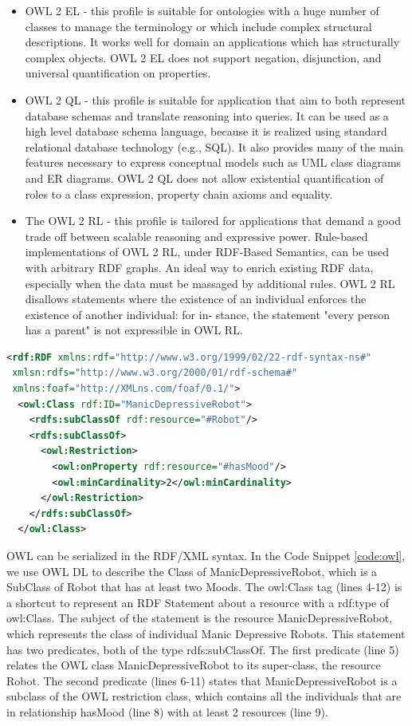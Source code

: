 \begin{itemize}
\item OWL 2 EL - this profile is suitable for ontologies with a huge number of classes to manage the terminology or which include complex structural descriptions. It works well for domain an applications which has structurally complex objects. OWL 2 EL does not support negation, disjunction, and universal quantification on properties.

\item OWL 2 QL  - this profile is suitable for application that aim to both represent database schemas  and translate reasoning into queries. It can be used as a high level database schema language, because it is realized using standard relational database technology (e.g., SQL). It also provides many of the main features necessary to express conceptual models such as UML class diagrams and ER diagrams. OWL 2 QL does not allow existential quantification of roles to a class expression, property chain axioms and equality.
\item The OWL 2 RL - this profile is tailored for applications that demand a good trade off between scalable reasoning and expressive power. Rule-based implementations of OWL 2 RL, under RDF-Based Semantics, can be used with arbitrary RDF graphs. An ideal way to enrich existing RDF data, especially when the data must be massaged by additional rules. OWL 2 RL disallows statements where the existence of an individual enforces the existence of another individual: for in- stance, the statement "every person has a parent" is not expressible in OWL RL.

\end{itemize}

\begin{lstlisting}[language=XML, caption=An example of a simple OWL DL RDF/XML document:, label=code:owl]
<rdf:RDF xmlns:rdf="http://www.w3.org/1999/02/22-rdf-syntax-ns#"
 xmlsn:rdfs="http://www.w3.org/2000/01/rdf-schema#"
 xmlns:foaf="http://XMLns.com/foaf/0.1/">
  <owl:Class rdf:ID="ManicDepressiveRobot">
    <rdfs:subClassOf rdf:resource="#Robot"/>
    <rdfs:subClassOf>
      <owl:Restriction>
        <owl:onProperty rdf:resource="#hasMood"/>
        <owl:minCardinality>2</owl:minCardinality>
      </owl:Restriction>
    </rdfs:subClassOf>
  </owl:Class>
\end{lstlisting}

OWL can be serialized in the RDF/XML syntax. In the Code Snippet \ref{code:owl}, we use OWL DL to describe the Class of ManicDepressiveRobot, which is a SubClass of Robot that has at least two Moods. The owl:Class tag (lines 4-12) is a shortcut to represent an RDF Statement about a resource with a rdf:type of owl:Class. The subject of the statement is the resource ManicDepressiveRobot, which represents the class of individual Manic Depressive Robots. This statement has two predicates, both of the type rdfs:subClassOf. The first predicate (line 5) relates the OWL class ManicDepressiveRobot to its super-class, the resource Robot. The second predicate (lines 6-11) states that ManicDepressiveRobot is a subclass of the OWL restriction class, which contains all the individuals that are in relationship hasMood (line 8) with at least 2 resources (line 9).


